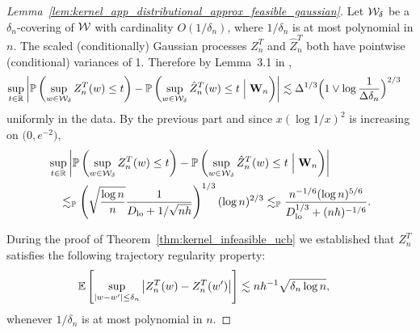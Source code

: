 \begin{proof}[%
  Lemma~\ref{lem:kernel_app_distributional_approx_feasible_gaussian}]

  Let $\mathcal{W}_\delta$ be a $\delta_n$-covering of $\mathcal{W}$
  with cardinality $O(1/\delta_n)$,
  where $1/\delta_n$ is at most polynomial in $n$.
  The scaled (conditionally) Gaussian
  processes $Z_n^T$ and $\hat Z_n^T$
  both have pointwise (conditional) variances of 1.
  Therefore by Lemma~3.1 in \citet{chernozhukov2013gaussian},
  \begin{align*}
    \sup_{t \in \mathbb{R}}
    \left|
    \mathbb{P}\left(
      \sup_{w \in \mathcal{W}_\delta}
      Z_n^T(w)
      \leq t
    \right)
    - \mathbb{P}\left(
      \sup_{w \in \mathcal{W}_\delta}
      \hat Z_n^T(w)
      \leq t
      \Bigm\vert \mathbf{W}_n
    \right)
    \right|
    &\lesssim
    \Delta^{1/3}
    \Big(
      1 \vee \log \frac{1}{\Delta \delta_n}
    \Big)^{2/3}
  \end{align*}
  uniformly in the data. By the previous part and
  since $x (\log 1/x)^2$ is increasing on $\big(0, e^{-2}\big)$,
  \begin{align*}
    &\sup_{t \in \mathbb{R}}
    \left|
    \mathbb{P}\left(
      \sup_{w \in \mathcal{W}_\delta}
      Z_n^T(w)
      \leq t
    \right)
    - \mathbb{P}\left(
      \sup_{w \in \mathcal{W}_\delta}
      \hat Z_n^T(w)
      \leq t
      \Bigm\vert \mathbf{W}_n
    \right)
    \right| \\
    &\quad\lesssim_{\mathbb{P}}
    \left(
      \sqrt{\frac{\log n}{n}}
      \frac{1}{D_{\textup{lo}} + 1/\sqrt{n h}}
    \right)^{1/3}
    (\log n)^{2/3}
    \lesssim_{\mathbb{P}}
    \frac{n^{-1/6}(\log n)^{5/6}}
    {D_{\textup{lo}}^{1/3} + (n h)^{-1/6}}.
  \end{align*}


  During the proof of
  Theorem~\ref{thm:kernel_infeasible_ucb}
  we established that
  $Z_n^T$ satisfies the following
  trajectory regularity property:
  \begin{align*}
    \mathbb{E}\left[
      \sup_{|w-w'| \leq \delta_n}
      \big| Z_n^T(w) - Z_n^T(w') \big|
    \right]
    &\lesssim
    n h^{-1}
    \sqrt{\delta_n \log n},
  \end{align*}
  whenever $1/\delta_n$
  is at most polynomial in $n$.



\end{proof}
